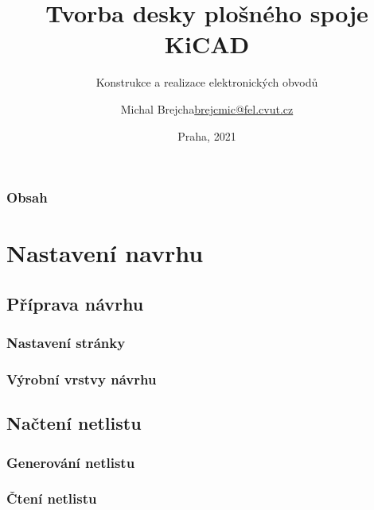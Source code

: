 \documentclass{beamer}
\title[KiCAD Eeschema]{Tvorba desky plošného spoje KiCAD}
\subtitle[KEO] {Konstrukce a realizace elektronických obvodů}
\author[Brejcha]{\texorpdfstring{Michal Brejcha\newline\url{brejcmic@fel.cvut.cz}}{Michal Brejcha}}
\institute[ČVUT]{ČVUT v Praze, FEL}
\date[Praha, 2021]{Praha, 2021}
\begin{document}
\frame{\titlepage}

\begin{frame}
\frametitle{Obsah} 
\tableofcontents
\end{frame}


\section{\texorpdfstring{Nastavení navrhu}{Nastavení navrhu}}
\subsection{\texorpdfstring{Příprava návrhu}{Priprava navrhu}}
\begin{frame}
	\frametitle{Nastavení stránky}
	
\end{frame}
\begin{frame}
	\frametitle{Výrobní vrstvy návrhu}
	
\end{frame}

\subsection{\texorpdfstring{Načtení netlistu}{Nacteni netlistu}}
\begin{frame}
	\frametitle{Generování netlistu}

\end{frame}
\begin{frame}
	\frametitle{Čtení netlistu}

\end{frame}
\end{document}
